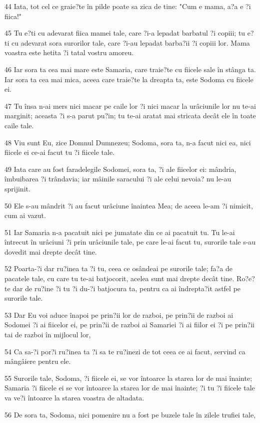 \par 44 Iata, tot cel ce graie?te în pilde poate sa zica de tine: "Cum e mama, a?a e ?i fiica!"
\par 45 Tu e?ti cu adevarat fiica mamei tale, care ?i-a lepadat barbatul ?i copiii; tu e?ti cu adevarat sora surorilor tale, care ?i-au lepadat barba?ii ?i copiii lor. Mama voastra este hetita ?i tatal vostru amoreu.
\par 46 Iar sora ta cea mai mare este Samaria, care traie?te cu fiicele sale în stânga ta. Iar sora ta cea mai mica, aceea care traie?te la dreapta ta, este Sodoma cu fiicele ei.
\par 47 Tu însa n-ai mers nici macar pe caile lor ?i nici macar la urâciunile lor nu te-ai marginit; aceasta ?i s-a parut pu?in; tu te-ai aratat mai stricata decât ele în toate caile tale.
\par 48 Viu sunt Eu, zice Domnul Dumnezeu; Sodoma, sora ta, n-a facut nici ea, nici fiicele ei ce-ai facut tu ?i fiicele tale.
\par 49 Iata care au fost faradelegile Sodomei, sora ta, ?i ale fiicelor ei: mândria, îmbuibarea ?i trândavia; iar mâinile saracului ?i ale celui nevoia? nu le-au sprijinit.
\par 50 Ele s-au mândrit ?i au facut urâciune înaintea Mea; de aceea le-am ?i nimicit, cum ai vazut.
\par 51 Iar Samaria n-a pacatuit nici pe jumatate din ce ai pacatuit tu. Tu le-ai întrecut în urâciuni ?i prin urâciunile tale, pe care le-ai facut tu, surorile tale s-au dovedit mai drepte decât tine.
\par 52 Poarta-?i dar ru?inea ta ?i tu, ceea ce osândeai pe surorile tale; fa?a de pacatele tale, cu care tu te-ai batjocorit, acelea sunt mai drepte decât tine. Ro?e?te dar de ru?ine ?i tu ?i du-?i batjocura ta, pentru ca ai îndrepta?it astfel pe surorile tale.
\par 53 Dar Eu voi aduce înapoi pe prin?ii lor de razboi, pe prin?ii de razboi ai Sodomei ?i ai fiicelor ei, pe prin?ii de razboi ai Samariei ?i ai fiilor ei ?i pe prin?ii tai de razboi în mijlocul lor,
\par 54 Ca sa-?i por?i ru?inea ta ?i sa te ru?inezi de tot ceea ce ai facut, servind ca mângâiere pentru ele.
\par 55 Surorile tale, Sodoma, ?i fiicele ei, se vor întoarce la starea lor de mai înainte; Samaria ?i fiicele ei se vor întoarce la starea lor de mai înainte; ?i tu ?i fiicele tale va ve?i întoarce la starea voastra de altadata.
\par 56 De sora ta, Sodoma, nici pomenire nu a fost pe buzele tale în zilele trufiei tale,
